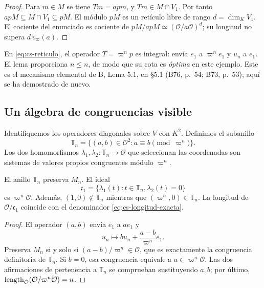 \begin{proof}
Para $m\in M$ se tiene $Tm=apm$, y $Tm\in M\cap V_1$.
Por tanto $apM\subseteq M\cap V_1\subseteq pM$.
El módulo $pM$ es un retículo libre de rango
$d=\dim_K V_1$. El cociente del enunciado es cociente de
$pM/apM\simeq(\mathcal O/a\mathcal O)^d$;
su longitud no supera $d\,v_\varpi(a)$.
\end{proof}

En \eqref{eq:cs-reticulo}, el operador $T=\varpi^n p$ es
integral: envía $e_1$ a $\varpi^n e_1$ y $u_n$ a $e_1$.
El lema proporciona $n\le n$, de modo que su cota es
\emph{óptima} en este ejemplo. Este es el mecanismo elemental
de B, Lema 5.1, en §5.1 (B76, p.~54; B73, p.~53);
aquí se ha demostrado de nuevo.

\subsection{Un álgebra de congruencias visible}

Identifiquemos los operadores diagonales sobre $V$ con $K^2$.
Definimos el subanillo
\begin{equation}
 \mathbb T_n=\{(a,b)\in\mathcal O^2:
                a\equiv b\pmod{\varpi^n}\}.
 \label{eq:cs-Tn}
\end{equation}
Los dos homomorfismos $\lambda_1,\lambda_2:\mathbb T_n\to
\mathcal O$ que seleccionan las coordenadas son sistemas de
valores propios congruentes módulo $\varpi^n$.

\begin{proposicion}
\label{prop:cs-ideal}
El anillo $\mathbb T_n$ preserva $M_n$. El ideal
\begin{equation}
 \mathfrak c_1
 =\{\lambda_1(t):t\in\mathbb T_n,
                      \lambda_2(t)=0\}
 \label{eq:cs-ideal}
\end{equation}
es $\varpi^n\mathcal O$. Además,
$(1,0)\notin\mathbb T_n$ mientras que
$(\varpi^n,0)\in\mathbb T_n$. La longitud de
$\mathcal O/\mathfrak c_1$ coincide con el denominador
\eqref{eq:cs-longitud-exacta}.
\end{proposicion}

\begin{proof}
El operador $(a,b)$ envía $e_1$ a $ae_1$ y
\[
 u_n\longmapsto bu_n+\frac{a-b}{\varpi^n}e_1.
\]
Preserva $M_n$ si y solo si $(a-b)/\varpi^n\in\mathcal O$,
que es exactamente la congruencia definitoria de $\mathbb T_n$.
Si $b=0$, esa congruencia equivale a $a\in\varpi^n\mathcal O$.
Las dos afirmaciones de pertenencia a $\mathbb T_n$ se
comprueban sustituyendo $a,b$; por último,
$\operatorname{length}_{\mathcal O}(\mathcal O/\varpi^n\mathcal O)=n$.
\end{proof}

